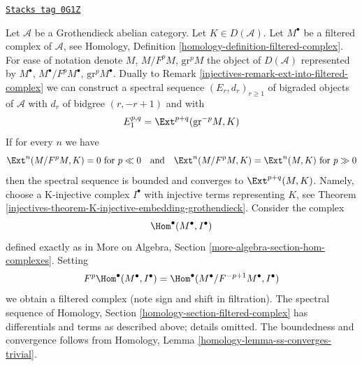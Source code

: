 \begin{remark}
\label{injectives-remark-ext-from-filtered-complex}
\href{https://stacks.math.columbia.edu/tag/0G1Z}{\texttt{Stacks tag 0G1Z}}

Let $\mathcal{A}$ be a Grothendieck abelian category. Let
$K \in D(\mathcal{A})$. Let $M^\bullet$ be a filtered complex of
$\mathcal{A}$, see Homology, Definition
\ref{homology-definition-filtered-complex}.
For ease of notation denote $M$, $M/F^pM$, $\text{gr}^pM$ the
object of $D(\mathcal{A})$ represented by $M^\bullet$,
$M^\bullet/F^pM^\bullet$, $\text{gr}^pM^\bullet$.
Dually to Remark \ref{injectives-remark-ext-into-filtered-complex}
we can construct a spectral sequence $(E_r, d_r)_{r \geq 1}$
of bigraded objects of $\mathcal{A}$ with $d_r$ of bidgree
$(r, -r + 1)$ and
with
$$
E_1^{p, q} = \Ext^{p + q}(\text{gr}^{-p}M, K)
$$
If for every $n$ we have
$$
\Ext^n(M/F^pM, K) = 0 \text{ for } p \ll 0
\quad\text{and}\quad
\Ext^n(M/F^pM, K) = \Ext^n(M, K) \text{ for } p \gg 0
$$
then the spectral sequence is bounded and converges to $\Ext^{p + q}(M, K)$.
Namely, choose a K-injective complex $I^\bullet$ with injective terms
representing $K$, see Theorem \ref{injectives-theorem-K-injective-embedding-grothendieck}.
Consider the complex
$$
\Hom^\bullet(M^\bullet, I^\bullet)
$$
defined exactly as in
More on Algebra, Section \ref{more-algebra-section-hom-complexes}.
Setting
$$
F^p\Hom^\bullet(M^\bullet, I^\bullet) =
\Hom^\bullet(M^\bullet/F^{-p + 1}M^\bullet, I^\bullet)
$$
we obtain a filtered complex (note sign and shift in filtration).
The spectral sequence of
Homology, Section \ref{homology-section-filtered-complex}
has differentials and terms as described above; details omitted.
The boundedness and convergence follows from
Homology, Lemma \ref{homology-lemma-ss-converges-trivial}.
\end{remark}

